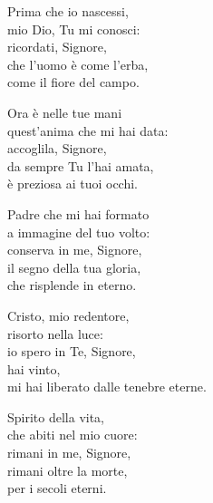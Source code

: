 

\spazio

\strofa Prima che io nascessi,\\
mio Dio, Tu mi conosci:\\
ricordati, Signore,\\
che l'uomo è come l'erba,\\
come il fiore del campo.

\spazio


\spazio

\strofa Ora è nelle tue mani\\
quest'anima che mi hai data:\\
accoglila, Signore,\\
da sempre Tu l'hai amata,\\
è preziosa ai tuoi occhi.

\spazio


\spazio

\strofa Padre che mi hai formato\\
a immagine del tuo volto: \\
conserva in me, Signore,\\
il segno della tua gloria,\\
che risplende in eterno.

\spazio


\spazio

\strofa Cristo, mio redentore,\\
risorto nella luce:\\
io spero in Te, Signore,\\
hai vinto,\\
mi hai liberato dalle tenebre eterne.

\spazio


\spazio

\strofa Spirito della vita,\\
che abiti nel mio cuore:\\
rimani in me, Signore,\\
rimani oltre la morte,\\
per i secoli eterni.

\spazio

